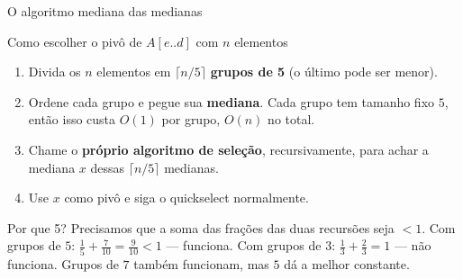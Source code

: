 \documentclass[aspectratio=169]{beamer}
\begin{document}
\begin{frame}[shrink=20]{O algoritmo mediana das medianas}
  \begin{block}{Como escolher o pivô de $A[e..d]$ com $n$ elementos}
    \begin{enumerate}
      \item Divida os $n$ elementos em $\lceil n/5 \rceil$ \textbf{grupos de 5}
            (o último pode ser menor).
      \item Ordene cada grupo e pegue sua \textbf{mediana}. Cada grupo tem
            tamanho fixo $5$, então isso custa $O(1)$ por grupo, $O(n)$ no total.
      \item Chame o \textbf{próprio algoritmo de seleção}, recursivamente,
            para achar a mediana $x$ dessas $\lceil n/5 \rceil$ medianas.
      \item Use $x$ como pivô e siga o quickselect normalmente.
    \end{enumerate}
  \end{block}

  \begin{exampleblock}{Por que 5?}
    Precisamos que a soma das frações das duas recursões seja $< 1$.
    Com grupos de $5$: $\tfrac{1}{5} + \tfrac{7}{10} = \tfrac{9}{10} < 1$ ---
    funciona. Com grupos de $3$: $\tfrac{1}{3} + \tfrac{2}{3} = 1$ --- não
    funciona. Grupos de $7$ também funcionam, mas $5$ dá a melhor constante.
  \end{exampleblock}
\end{frame}
\end{document}
